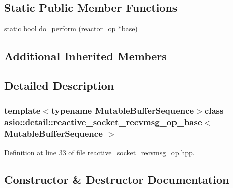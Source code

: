 \subsection*{Static Public Member Functions}
\begin{DoxyCompactItemize}
\item 
static bool \hyperlink{classasio_1_1detail_1_1reactive__socket__recvmsg__op__base_ac7b9a2460ae432b07ca7019166364574}{do\+\_\+perform} (\hyperlink{classasio_1_1detail_1_1reactor__op}{reactor\+\_\+op} $\ast$base)
\end{DoxyCompactItemize}
\subsection*{Additional Inherited Members}


\subsection{Detailed Description}
\subsubsection*{template$<$typename Mutable\+Buffer\+Sequence$>$class asio\+::detail\+::reactive\+\_\+socket\+\_\+recvmsg\+\_\+op\+\_\+base$<$ Mutable\+Buffer\+Sequence $>$}



Definition at line 33 of file reactive\+\_\+socket\+\_\+recvmsg\+\_\+op.\+hpp.



\subsection{Constructor \& Destructor Documentation}
\hypertarget{classasio_1_1detail_1_1reactive__socket__recvmsg__op__base_ae84e7e5ece471116f543eeaba78bc605}{}
